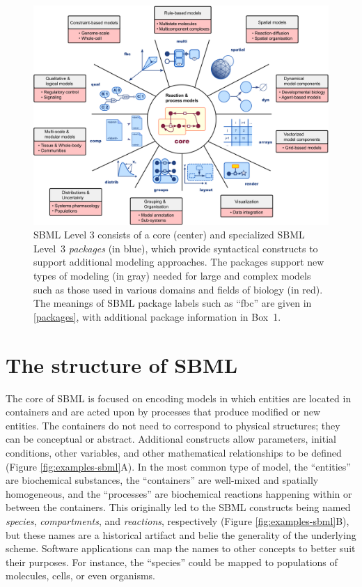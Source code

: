 \documentclass{sbml-paper}
\begin{document}
\begin{figure}[b]
  \center
  \includegraphics[width=\textwidth]{resources/SBML-Level3-v12.pdf}
\caption{SBML Level 3 consists of a core (center) and specialized SBML Level~3 \emph{packages} (in blue), which provide syntactical constructs to support additional modeling approaches. The packages support new types of modeling (in gray) needed for large and complex models such as those used in various domains and fields of biology (in red). The meanings of SBML package labels such as ``fbc'' are given in \autoref{packages}, with additional package information in Box~1.}
\label{level-3-diagram}
\end{figure}

\clearpage
\newpage

\section*{The structure of SBML}
\label{sec:sbml}

The core of SBML is focused on encoding models in which entities are located in containers and are acted upon by processes that produce modified or new entities.  The containers do not need to correspond to physical structures; they can be conceptual or abstract.  Additional constructs allow parameters, initial conditions, other variables, and other mathematical relationships to be defined (Figure \ref{fig:examples-sbml}A).  In the most common type of model, the ``entities'' are biochemical substances, the ``containers'' are well-mixed and spatially homogeneous, and the ``processes'' are biochemical reactions happening within or between the containers.  This originally led to the SBML constructs being named \emph{species}, \emph{compartments}, and \emph{reactions}, respectively (Figure \ref{fig:examples-sbml}B), but these names are a historical artifact and belie the generality of the underlying scheme.  Software applications can map the names to other concepts to better suit their purposes.  For instance, the ``species'' could be mapped to populations of molecules, cells, or even organisms.
\end{document}
